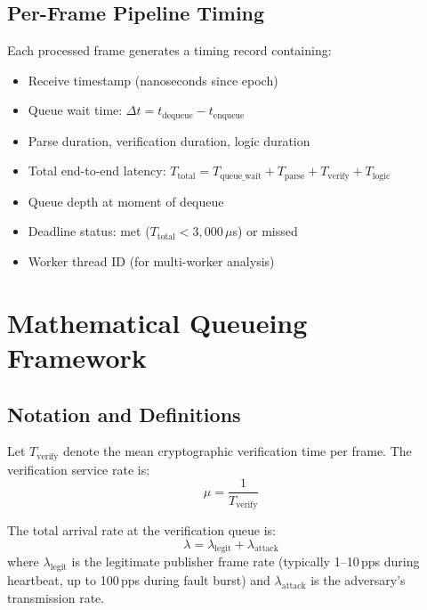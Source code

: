 \documentclass{ieeeaccess}
\begin{document}
\subsection{Per-Frame Pipeline Timing}
Each processed frame generates a timing record containing:
\begin{itemize}[leftmargin=*]
    \item Receive timestamp (nanoseconds since epoch)
    \item Queue wait time: $\Delta t = t_{\text{dequeue}} - t_{\text{enqueue}}$
    \item Parse duration, verification duration, logic duration
    \item Total end-to-end latency: $T_{\text{total}} = T_{\text{queue\_wait}} + T_{\text{parse}} + T_{\text{verify}} + T_{\text{logic}}$
    \item Queue depth at moment of dequeue
    \item Deadline status: met ($T_{\text{total}} < 3{,}000\,\mu$s) or missed
    \item Worker thread ID (for multi-worker analysis)
\end{itemize}

\section{Mathematical Queueing Framework}

\subsection{Notation and Definitions}
Let $T_{\text{verify}}$ denote the mean cryptographic verification time per frame. The verification service rate is:
\begin{equation}
\mu = \frac{1}{T_{\text{verify}}}
\end{equation}

The total arrival rate at the verification queue is:
\begin{equation}
\lambda = \lambda_{\text{legit}} + \lambda_{\text{attack}}
\end{equation}
where $\lambda_{\text{legit}}$ is the legitimate publisher frame rate (typically 1--10\,pps during heartbeat, up to 100\,pps during fault burst) and $\lambda_{\text{attack}}$ is the adversary's transmission rate.
\end{document}
